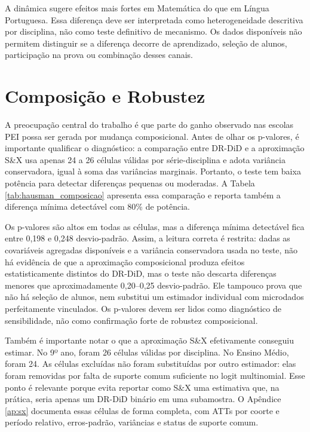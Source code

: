 A dinâmica sugere efeitos mais fortes em Matemática do que em Língua Portuguesa. Essa diferença deve ser interpretada como heterogeneidade descritiva por disciplina, não como teste definitivo de mecanismo. Os dados disponíveis não permitem distinguir se a diferença decorre de aprendizado, seleção de alunos, participação na prova ou combinação desses canais.

\section{Composição e Robustez} \label{sec:robustez}

A preocupação central do trabalho é que parte do ganho observado nas escolas PEI possa ser gerada por mudança composicional. Antes de olhar os p-valores, é importante qualificar o diagnóstico: a comparação entre DR-DiD e a aproximação S\&X usa apenas 24 a 26 células válidas por série-disciplina e adota variância conservadora, igual à soma das variâncias marginais. Portanto, o teste tem baixa potência para detectar diferenças pequenas ou moderadas. A Tabela \ref{tab:hausman_composicao} apresenta essa comparação e reporta também a diferença mínima detectável com 80\% de potência.



Os p-valores são altos em todas as células, mas a diferença mínima detectável fica entre 0,198 e 0,248 desvio-padrão. Assim, a leitura correta é restrita: dadas as covariáveis agregadas disponíveis e a variância conservadora usada no teste, não há evidência de que a aproximação composicional produza efeitos estatisticamente distintos do DR-DiD, mas o teste não descarta diferenças menores que aproximadamente 0,20--0,25 desvio-padrão. Ele tampouco prova que não há seleção de alunos, nem substitui um estimador individual com microdados perfeitamente vinculados. Os p-valores devem ser lidos como diagnóstico de sensibilidade, não como confirmação forte de robustez composicional.

Também é importante notar o que a aproximação S\&X efetivamente conseguiu estimar. No 9º ano, foram 26 células válidas por disciplina. No Ensino Médio, foram 24. As células excluídas não foram substituídas por outro estimador: elas foram removidas por falta de suporte comum suficiente no logit multinomial. Esse ponto é relevante porque evita reportar como S\&X uma estimativa que, na prática, seria apenas um DR-DiD binário em uma subamostra. O Apêndice \ref{ap:sx} documenta essas células de forma completa, com ATTs por coorte e período relativo, erros-padrão, variâncias e status de suporte comum.

